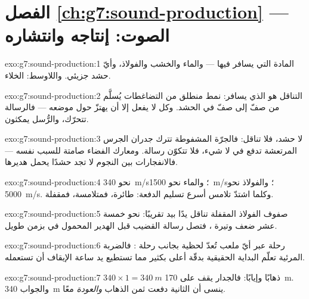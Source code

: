 \section*{الفصل \ref{ch:g7:sound-production} --- الصوت: إنتاجه وانتشاره}

\begin{solution}{exo:g7:sound-production:1}
المادة التي يسافر فيها  ---  والماء والخشب
والفولاذ، وأيّ حشد جزيئي. واللاوسط: الخلاء.
\end{solution}

\begin{solution}{exo:g7:sound-production:2}
التناقل هو الذي يسافر: نمط منطلق من التضاغطات يُسلَّم من صفّ إلى
صفّ في الحشد. وكل  لا يفعل إلا أن يهتزّ حول موضعه ---
فالرسالة تتحرّك، والرُّسل يمكثون.
\end{solution}

\begin{solution}{exo:g7:sound-production:3}
لا حشد، فلا تناقل: فالجرّة المشفوطة تترك جدران الجرس المرتعشة
تدفع في لا شيء، فلا تتكوّن رسالة. ومعارك الفضاء صامتة للسبب
نفسه --- فالانفجارات بين النجوم لا تجد حشدًا يحمل هديرها.
\end{solution}

\begin{solution}{exo:g7:sound-production:4}
 نحو \qty{340}{m/s}؛ والماء نحو \qty{1500}{m/s}؛
والفولاذ نحو \qty{5000}{m/s}. وكلما اشتدّ تلامس  أسرع
تسليم الدفعة: طائرة، فمتلامسة، فمقفلة.
\end{solution}

\begin{solution}{exo:g7:sound-production:5}
صفوف الفولاذ المقفلة تناقل يدًا بيد تقريبًا: نحو خمسة عشر ضعف
وتيرة ، فتصل رسالة القضيب قبل الهدير المحمول في 
بزمن طويل.
\end{solution}

\begin{solution}{exo:g7:sound-production:6}
رحلة  عبر أيّ ملعب تُعدّ لحظية بجانب رحلة : فالضربة
المرئية تعلّم البداية الحقيقية بدقّة أعلى بكثير مما تستطيع يد
ساعة الإيقاف أن تستعمله.
\end{solution}

\begin{solution}{exo:g7:sound-production:7}
$340 \times 1 = \qty{340}{m}$ ذهابًا وإيابًا: فالجدار يقف على
\qty{170}{m}. والجواب \qty{340}{m} ينسى أن الثانية دفعت ثمن
الذهاب \emph{والعودة} معًا.
\end{solution}

